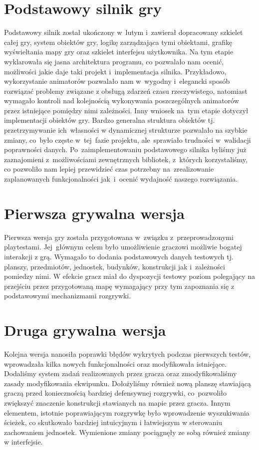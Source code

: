 \documentclass[licencjacka]{pracamgr}
\begin{document}
  \section{Podstawowy silnik gry}
  Podstawowy silnik został ukończony w~lutym i~zawierał dopracowany szkielet całej gry, system obiektów gry,
  logikę zarządzająca tymi obiektami, grafikę wyświeltania mapy gry oraz szkielet interfejsu użytkownika.
  Na tym etapie wyklarowała się jasna architektura programu, co pozwalało nam ocenić, możliwości jakie
  daje taki projekt i~implementacja silnika. Przykładowo, wykorzystanie animatorów pozwalało nam w~wygodny
  i~elegancki sposób rozwiązać problemy związane z obsługą zdarzeń czasu rzeczywistego, natomiast wymagało kontroli
  nad kolejnością wykonywania poszczególnych animatorów przez istniejące pomiędzy nimi zależności. Inny wniosek
  na~tym etapie dotyczył implementacji obiektów gry. Bardzo generalna struktura obiektów tj. przetrzymywanie
  ich~własności w dynamicznej strukturze pozwalało na szybkie zmiany, co~było częste w~tej~fazie projektu,
  ale~sprawiało trudności w~walidacji poprawności danych.
  Po~zaimplementowaniu podstawowego silnika byliśmy już zaznajomieni z~możliwościami zewnętrznych bibliotek,
  z~których korzystaliśmy, co pozwoliło nam lepiej przewidzieć czas potrzebny na~zrealizowanie zaplanowanych
  funkcjonalności jak~i~ocenić wydajność naszego rozwiązania.

  \section{Pierwsza grywalna wersja}
  Pierwsza wersja gry została przygotowana w~związku z~przeprowadzonymi playtestami. Jej~głównym celem było
  umożliwienie graczowi możliwie bogatej interakcji z grą. Wymagało to dodania podstawowych
  danych testowych tj. planszy, przedmiotów, jednostek, budynków, konstrukcji jak i~zależności pomiedzy nimi.
  W efekcie gracz miał do dyspozycji testowy poziom polegający na przejściu przez przygotowaną mapę wymagający
  przy tym zapoznania się z podstawowymi mechanizmami rozgrywki.

  \section{Druga grywalna wersja}
  Kolejna wersja nanosiła poprawki błędów wykrytych podczas pierwszych testów, wprowadzała kilka nowych funkcjonalności
  oraz modyfikowała istniejące. Dodaliśmy system zadań realizowanych przez gracza oraz zmodyfikowaliśmy zasady modyfikowania
  ekwipunku. Dołożyliśmy również nową planszę stawiającą graczą przed koniecznością bardziej defensywnej rozgrywki,
  co~pozwoliło zwiększyć znaczenie konstrukcji stawianych na mapie przez gracza. Innym elementem, istotnie poprawiającym
  rozgrywkę było wprowadzenie wyszukiwania ścieżek, co skutkowało bardziej intuicyjnym i łatwiejszym w sterowaniu
  zachowaniem jednostek. Wymienione zmiany pociągnęły ze sobą również zmiany w interfejsie.
\end{document}
